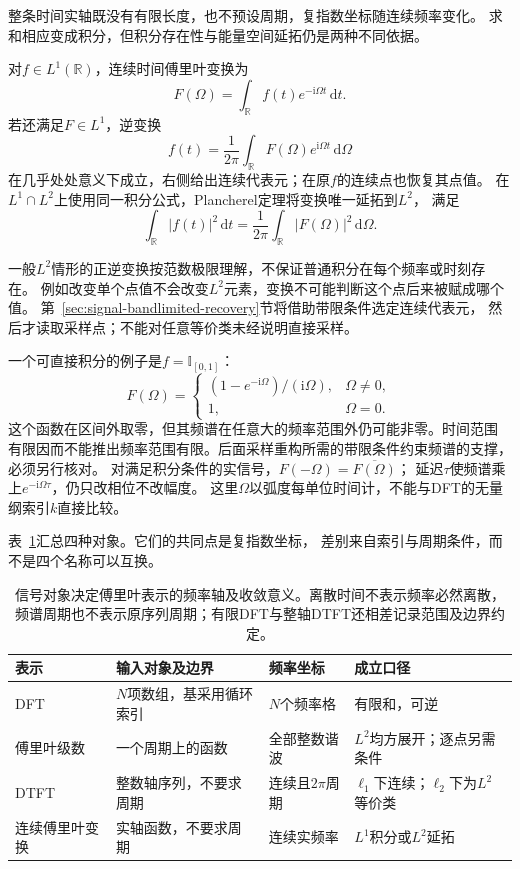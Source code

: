 整条时间实轴既没有有限长度，也不预设周期，复指数坐标随连续频率变化。
求和相应变成积分，但积分存在性与能量空间延拓仍是两种不同依据。
\begin{definition}[连续时间傅里叶变换]
  \label{def:signal-analysis-continuous-fourier-transform}
  对$f\in L^1(\mathbb R)$，连续时间傅里叶变换为
  \[
    F(\Omega)=\int_{\mathbb R}f(t)e^{-\mathrm i\Omega t}\,\mathrm dt.
  \]
  若还满足$F\in L^1$，逆变换
  \[
    f(t)=\frac1{2\pi}\int_{\mathbb R}F(\Omega)e^{\mathrm i\Omega t}\,\mathrm d\Omega
  \]
  在几乎处处意义下成立，右侧给出连续代表元；在原$f$的连续点也恢复其点值。
  在$L^1\cap L^2$上使用同一积分公式，Plancherel定理将变换唯一延拓到$L^2$，
  满足
  \[
    \int_{\mathbb R}|f(t)|^2\,\mathrm dt
    =\frac1{2\pi}\int_{\mathbb R}|F(\Omega)|^2\,\mathrm d\Omega.
  \]
\end{definition}
一般$L^2$情形的正逆变换按范数极限理解，不保证普通积分在每个频率或时刻存在。
例如改变单个点值不会改变$L^2$元素，变换不可能判断这个点后来被赋成哪个值。
第~\ref{sec:signal-bandlimited-recovery}节将借助带限条件选定连续代表元，
然后才读取采样点；不能对任意等价类未经说明直接采样。

一个可直接积分的例子是$f=\mathbb I_{[0,1]}$：
\[
  F(\Omega)=
  \begin{cases}
    (1-e^{-\mathrm i\Omega})/(\mathrm i\Omega),&\Omega\neq0,\\
    1,&\Omega=0.
  \end{cases}
\]
这个函数在区间外取零，但其频谱在任意大的频率范围外仍可能非零。时间范围
有限因而不能推出频率范围有限。后面采样重构所需的带限条件约束频谱的支撑，
必须另行核对。
对满足积分条件的实信号，$F(-\Omega)=\overline{F(\Omega)}$；
延迟$\tau$使频谱乘上$e^{-\mathrm i\Omega\tau}$，仍只改相位不改幅度。
这里$\Omega$以弧度每单位时间计，不能与DFT的无量纲索引$k$直接比较。

表~\ref{tab:reader-fourier-objects}汇总四种对象。它们的共同点是复指数坐标，
差别来自索引与周期条件，而不是四个名称可以互换。
\begin{table}[htbp]
  \centering
  \begin{tabularx}{\linewidth}{lXXX}
    \toprule
    表示 & 输入对象及边界 & 频率坐标 & 成立口径\\
    \midrule
    DFT & $N$项数组，基采用循环索引 & $N$个频率格 & 有限和，可逆\\
    傅里叶级数 & 一个周期上的函数 & 全部整数谐波 & $L^2$均方展开；逐点另需条件\\
    DTFT & 整数轴序列，不要求周期 & 连续且$2\pi$周期 & $\ell_1$下连续；$\ell_2$下为$L^2$等价类\\
    连续傅里叶变换 & 实轴函数，不要求周期 & 连续实频率 & $L^1$积分或$L^2$延拓\\
    \bottomrule
  \end{tabularx}
  \caption{信号对象决定傅里叶表示的频率轴及收敛意义。离散时间不表示频率必然离散，
  频谱周期也不表示原序列周期；有限DFT与整轴DTFT还相差记录范围及边界约定。}
  \label{tab:reader-fourier-objects}
\end{table}

